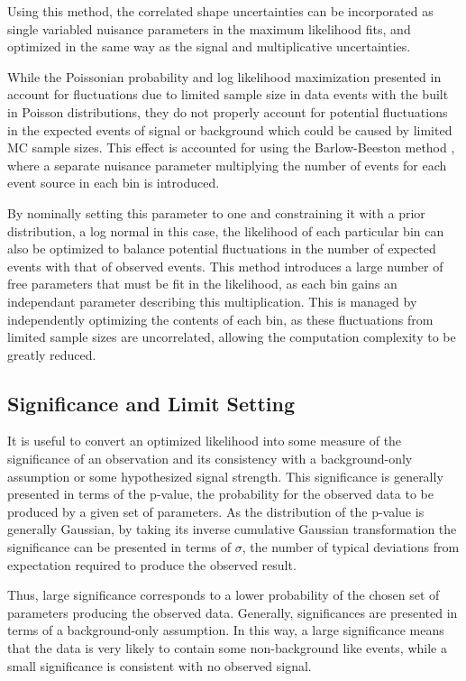 Using this method, the correlated shape uncertainties can be incorporated as single variabled nuisance parameters in the maximum likelihood fits, and optimized in the same way as the signal and multiplicative uncertainties.

While the Poissonian probability and log likelihood maximization presented in  account for fluctuations due to limited sample size in data events with the built in Poisson distributions, they do not properly account for potential fluctuations in the expected events of signal or background which could be caused by limited MC sample sizes.
This effect is accounted for using the Barlow-Beeston method \cite{BarlowBeeston}, where a separate nuisance parameter multiplying the number of events for each event source in each bin is introduced.

By nominally setting this parameter to one and constraining it with a prior distribution, a log normal in this case, the likelihood of each particular bin can also be optimized to balance potential fluctuations in the number of expected events with that of observed events.
This method introduces a large number of free parameters that must be fit in the likelihood, as each bin gains an independant parameter describing this multiplication.
This is managed by independently optimizing the contents of each bin, as these fluctuations from limited sample sizes are uncorrelated, allowing the computation complexity to be greatly reduced.

\subsection{Significance and Limit Setting}
It is useful to convert an optimized likelihood into some measure of the significance of an observation and its consistency with a background-only assumption or some hypothesized signal strength. 
This significance is generally presented in terms of the p-value, the probability for the observed data to be produced by a given set of parameters. 
As the distribution of the p-value is generally Gaussian, by taking its inverse cumulative Gaussian transformation the significance can be presented in terms of $\sigma$, the number of typical deviations from expectation required to produce the observed result.

Thus, large significance corresponds to a lower probability of the chosen set of parameters producing the observed data.
Generally, significances are presented in terms of a background-only assumption. 
In this way, a large significance means that the data is very likely to contain some non-background like events, while a small significance is consistent with no observed signal.

